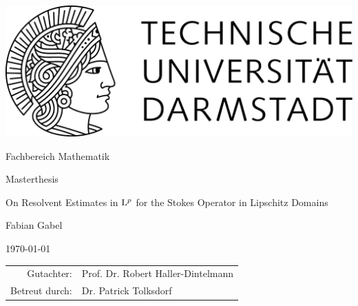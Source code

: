 \begin{titlepage}
  \begin{center}
    \includegraphics[width=0.5\linewidth]{TU_Darmstadt_Logo.pdf}
    \vfill
    
    \large{Fachbereich Mathematik}
    \vfill
    
    \large{Masterthesis}
    \vfill

    \huge{On Resolvent Estimates in $\mathrm{L}^p$ for the Stokes Operator in Lipschitz Domains}
    \vfill
    
		\large
    Fabian Gabel

    \large \today
    \vfill
\begin{tabular}{rl}
    Gutachter:& Prof. Dr. Robert Haller-Dintelmann
    \\
    Betreut durch:& Dr. Patrick Tolksdorf
\end{tabular}
  \end{center}
\end{titlepage}
